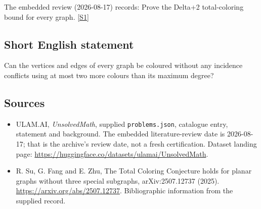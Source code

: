 \documentclass[11pt,a4paper]{article}
\newcommand{\sref}[2]{\hyperlink{source:#1:#2}{[S#2]}}
\begin{document}
The embedded review (2026-08-17) records: Prove the Delta+2 total-coloring bound for every graph. \sref{statement}{1}

\subsection{Short English statement}

Can the vertices and edges of every graph be coloured without any incidence conflicts using at most two more colours than its maximum degree?

\subsection{Sources}

{\small

\begin{itemize}

\item[\hypertarget{source:statement:1}{S1}] ULAM.AI, \emph{UnsolvedMath}, supplied \texttt{problems.json}, catalogue entry, statement and background. The embedded literature-review date is 2026-08-17; that is the archive’s review date, not a fresh certification. Dataset landing page: \url{https://huggingface.co/datasets/ulamai/UnsolvedMath}.

\item[\hypertarget{source:statement:2}{S2}] R. Su, G. Fang and E. Zhu, The Total Coloring Conjecture holds for planar graphs without three special subgraphs, arXiv:2507.12737 (2025). \url{https://arxiv.org/abs/2507.12737}. Bibliographic information from the supplied record.

\end{itemize}

}

\label{end:statement}
\end{document}

